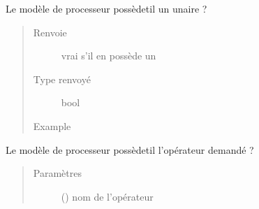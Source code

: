 \documentclass[letterpaper,10pt,french]{sphinxmanual}
\begin{document}
\begin{fulllineitems}
\begin{fulllineitems}
\begin{quote}
\begin{description}
\end{description}\end{quote}

\end{fulllineitems}


\begin{fulllineitems}
\label{\detokenize{processorengine:processorengine.ProcessorEngine.hasNEG}}
Le modèle de processeur possède\sphinxhyphen{}t\sphinxhyphen{}il un \sphinxhyphen{} unaire ?
\begin{quote}\begin{description}
\item[{Renvoie}] \leavevmode
vrai s’il en possède un

\item[{Type renvoyé}] \leavevmode
bool

\item[{Example}] \leavevmode
\begin{sphinxVerbatim}[commandchars=\\\{\}]
\end{sphinxVerbatim}

\begin{sphinxVerbatim}[commandchars=\\\{\}]
\end{sphinxVerbatim}

\end{description}\end{quote}

\end{fulllineitems}


\begin{fulllineitems}
\label{\detokenize{processorengine:processorengine.ProcessorEngine.hasOperator}}
Le modèle de processeur possède\sphinxhyphen{}t\sphinxhyphen{}il l’opérateur demandé ?
\begin{quote}\begin{description}
\item[{Paramètres}] \leavevmode
{} () \textendash{} nom de l’opérateur


\end{description}
\end{quote}
\end{fulllineitems}
\end{fulllineitems}
\end{document}
